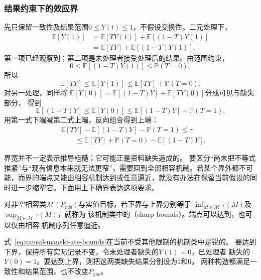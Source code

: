\subsubsection{结果约束下的效应界}
\label{sec:causal-outcome-bounds}

先只保留一致性及结果范围\(0\leq Y(t)\leq1\)，不假设交换性。二元处理下，
\[
  \begin{aligned}
    \mathbb E[Y(1)]
    &=\mathbb E[TY(1)]+\mathbb E[(1-T)Y(1)]\\
    &=\mathbb E[TY]+\mathbb E[(1-T)Y(1)].
  \end{aligned}
\]
第一项已经观察到；第二项是未处理者接受处理后的结果。由范围约束，
\[
  0\leq\mathbb E[(1-T)Y(1)]\leq\mathbb P(T=0),
\]
所以
\begin{equation}
  \mathbb E[TY]\leq\mathbb E[Y(1)]
  \leq\mathbb E[TY]+\mathbb P(T=0).
  \label{eq:causal-bounded-outcome-y1}
\end{equation}
对另一处理，同样将
\(\mathbb E[Y(0)]=\mathbb E[(1-T)Y]+\mathbb E[TY(0)]\)分成可见与缺失部分，
得到
\begin{equation}
  \mathbb E[(1-T)Y]\leq\mathbb E[Y(0)]
  \leq\mathbb E[(1-T)Y]+\mathbb P(T=1).
  \label{eq:causal-bounded-outcome-y0}
\end{equation}
用第一式下端减第二式上端，反向组合得到上端：
\begin{equation}
  \begin{aligned}
    &\mathbb E[TY]-\mathbb E[(1-T)Y]-\mathbb P(T=1)
      \leq\tau\\
    &\qquad\leq
      \mathbb E[TY]+\mathbb P(T=0)-\mathbb E[(1-T)Y].
  \end{aligned}
  \label{eq:causal-manski-ate-bounds}
\end{equation}

界宽并不一定表示推导粗糙；它可能正是资料缺失造成的。
要区分“尚未把不等式推紧”与“现有信息本来就无法更窄”，需要回到全部相容机制。若某个界外都不可能，而界的端点又能由相容机制达到或任意逼近，就没有办法在保留当前假设的同时进一步缩窄它。下面用上下确界表达这项要求。
\begin{definition}[相容机制类中的锐界]
  \label{def:causal-sharp-bounds}
  对非空相容类\(\mathcal M(P_{\mathrm{obs}})\)与实值目标，若下界与上界分别等于
  \(\inf_{M\in\mathcal M}\tau(M)\)及\(\sup_{M\in\mathcal M}\tau(M)\)，就称为
  该机制类中的（sharp bounds）。端点可以达到，也可以仅由相容
  机制序列任意逼近。
\end{definition}

式~\eqref{eq:causal-manski-ate-bounds}在当前不受其他限制的机制类中是锐的。
要达到下界，保持所有实际记录不变，令未处理者缺失的\(Y(1)=0\)，已处理者
缺失的\(Y(0)=1\)。要达到上界，则把这两类缺失结果分别设为\(1\)和\(0\)。
两种构造都满足一致性和结果范围，也不改变\(P_{\mathrm{obs}}\)。

